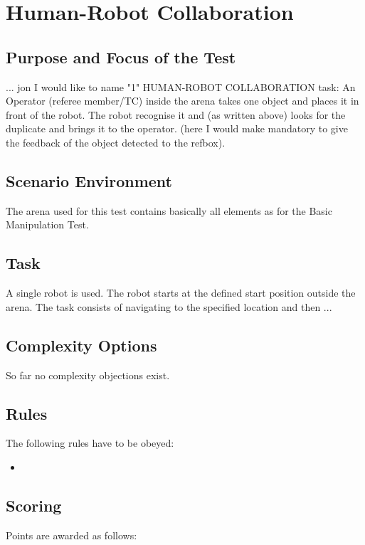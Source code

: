 \newpage
\section{Human-Robot Collaboration}

\subsection{Purpose and Focus of the Test}

 ... jon
I would like to name "1"  HUMAN-ROBOT COLLABORATION task: An Operator (referee member/TC) inside the arena takes one object  and places it in front of the robot. The robot recognise it and (as written above) looks for the duplicate and brings it to the operator. (here I would make mandatory to give the feedback of the object detected to the refbox).


\subsection{Scenario Environment}
The arena used for this test contains basically all elements as for the Basic Manipulation Test.

\begin{figure}
\begin{center}
\end{center}
\end{figure}

\subsection{Task}
A single robot is used. The robot starts at the defined start position outside the arena. The task consists of navigating to the specified location and then ...


\subsection{Complexity Options}

So far no complexity objections exist.

\subsection{Rules}
The following rules have to be obeyed:

\begin{itemize}
\item
\end{itemize}


\subsection{Scoring}
Points are awarded as follows:

